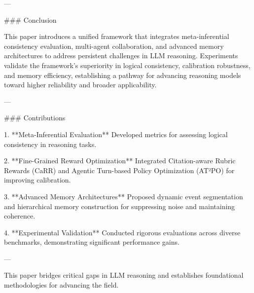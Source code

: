 ---

### Conclusion  

This paper introduces a unified framework that integrates meta-inferential consistency evaluation, multi-agent collaboration, and advanced memory architectures to address persistent challenges in LLM reasoning. Experiments validate the framework's superiority in logical consistency, calibration robustness, and memory efficiency, establishing a pathway for advancing reasoning models toward higher reliability and broader applicability.  

---

### Contributions  

1. **Meta-Inferential Evaluation**  
   Developed metrics for assessing logical consistency in reasoning tasks.  

2. **Fine-Grained Reward Optimization**  
   Integrated Citation-aware Rubric Rewards (CaRR) and Agentic Turn-based Policy Optimization (AT²PO) for improving calibration.  

3. **Advanced Memory Architectures**  
   Proposed dynamic event segmentation and hierarchical memory construction for suppressing noise and maintaining coherence.  

4. **Experimental Validation**  
   Conducted rigorous evaluations across diverse benchmarks, demonstrating significant performance gains.  

---

This paper bridges critical gaps in LLM reasoning and establishes foundational methodologies for advancing the field.